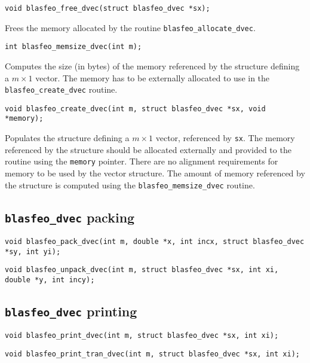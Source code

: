 \documentclass[a4paper]{report}
\begin{document}
\begin{verbatim}
void blasfeo_free_dvec(struct blasfeo_dvec *sx);
\end{verbatim}
Frees the memory allocated by the routine {\tt blasfeo\_allocate\_dvec}.

\begin{verbatim}
int blasfeo_memsize_dvec(int m);
\end{verbatim}
Computes the size (in bytes) of the memory referenced by the structure defining a $m\times 1$ vector.
The memory has to be externally allocated to use in the {\tt blasfeo\_create\_dvec} routine.

\begin{verbatim}
void blasfeo_create_dvec(int m, struct blasfeo_dvec *sx, void *memory);
\end{verbatim}
Populates the structure defining a $m\times 1$ vector, referenced by {\tt sx}.
The memory referenced by the structure should be allocated externally and provided to the routine using the {\tt memory} pointer.
There are no alignment requirements for memory to be used by the vector structure. %
The amount of memory referenced by the structure is computed using the {\tt blasfeo\_memsize\_dvec} routine.



\subsection{{\tt blasfeo\_dvec} packing}

\begin{verbatim}
void blasfeo_pack_dvec(int m, double *x, int incx, struct blasfeo_dvec *sy, int yi);
\end{verbatim}

\begin{verbatim}
void blasfeo_unpack_dvec(int m, struct blasfeo_dvec *sx, int xi, double *y, int incy);
\end{verbatim}



\subsection{{\tt blasfeo\_dvec} printing}

\begin{verbatim}
void blasfeo_print_dvec(int m, struct blasfeo_dvec *sx, int xi);
\end{verbatim}

\begin{verbatim}
void blasfeo_print_tran_dvec(int m, struct blasfeo_dvec *sx, int xi);
\end{verbatim}
\end{document}
